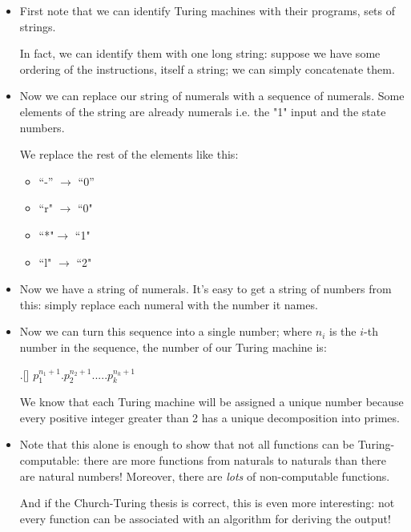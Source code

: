 \documentclass[justified]{tufte-handout}
\begin{document}
\begin{itemize}


\item First note that we can identify Turing machines with their programs, sets of strings. 

In fact, we can identify them with one long string: suppose we have some ordering of the instructions, itself a string; we can simply concatenate them.


\item Now we can replace our string of numerals with a sequence of numerals. Some elements of the string are already numerals i.e. the "1" input and the state numbers. 

We replace the rest of the elements like this:

\begin{itemize}

\item ``-'' $\rightarrow$ ``0''

\item ``r" $\rightarrow$ ``0"

\item ``*"$\rightarrow$ ``1"

\item ``l" $\rightarrow$ ``2"


\end{itemize}


\item Now we have a string of numerals. It's easy to get a string of numbers from this: simply replace each numeral with the number it names. 

\item Now we can turn this sequence into a single number; where $n_i$ is the $i$-th number in the sequence, the number of our Turing machine is: 

\ex.[] $p_1^{n_1+1}.p_2^{n_2+1}.....p_k^{n_k+1}$


We know that each Turing machine will be assigned a unique number because every positive integer greater than 2 has a unique decomposition into primes.


\item Note that this alone is enough to show that not all functions can be Turing-computable: there are more functions from naturals to naturals than there are natural numbers! Moreover, there are \emph{lots} of non-computable functions.

And if the Church-Turing thesis is correct, this is even more interesting: not every function can be associated with an algorithm for deriving the output!


\end{itemize}
\end{document}
